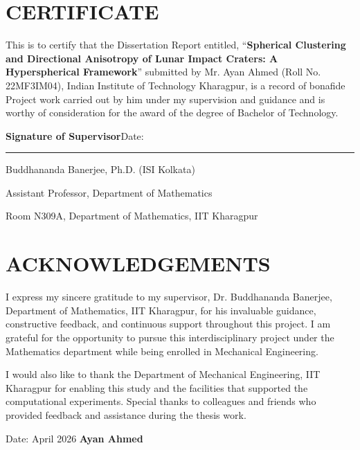 \documentclass[12pt,a4paper]{report}
\begin{document}
\newpage
\thispagestyle{empty}
\section*{CERTIFICATE}
\noindent This is to certify that the Dissertation Report entitled, ``\textbf{Spherical Clustering and Directional Anisotropy of Lunar Impact Craters: A Hyperspherical Framework}'' submitted by Mr. Ayan Ahmed (Roll No. 22MF3IM04), Indian Institute of Technology Kharagpur, is a record of bonafide Project work carried out by him under my supervision and guidance and is worthy of consideration for the award of the degree of Bachelor of Technology.

\vspace{2cm}
\noindent \textbf{Signature of Supervisor}\hfill Date: \rule{4cm}{0.4pt}\par
\vspace{0.4cm}
\noindent Buddhananda Banerjee, Ph.D. (ISI Kolkata)\par
\noindent Assistant Professor, Department of Mathematics\par
\noindent Room N309A, Department of Mathematics, IIT Kharagpur

\newpage
\thispagestyle{empty}
\section*{ACKNOWLEDGEMENTS}
\noindent I express my sincere gratitude to my supervisor, Dr. Buddhananda Banerjee, Department of Mathematics, IIT Kharagpur, for his invaluable guidance, constructive feedback, and continuous support throughout this project. I am grateful for the opportunity to pursue this interdisciplinary project under the Mathematics department while being enrolled in Mechanical Engineering.

\vspace{1em}
\noindent I would also like to thank the Department of Mechanical Engineering, IIT Kharagpur for enabling this study and the facilities that supported the computational experiments. Special thanks to colleagues and friends who provided feedback and assistance during the thesis work.

\vspace{2em}
\noindent Date: April 2026 \hfill \textbf{Ayan Ahmed}


\newpage
\end{document}
